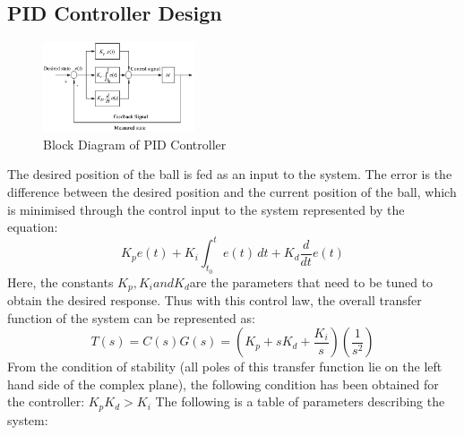 \documentclass[conference]{IEEEtran}
\begin{document}
\subsection*{PID Controller Design}
\begin{figure}[htbp]
\centerline{\includegraphics[width=0.4\textwidth]{BDPID.png}}
\caption{Block Diagram of PID Controller}
\label{fig2}
\end{figure}
The desired position of the ball is fed as an input to the system. The error is the difference between the desired position and the current position of the ball, which is minimised through the control input to the system represented by the equation:
\begin{equation}
K_p e(t) + K_i \int_{t_0}^{t} e(t) \,dt + K_d \frac{d}{dt}e(t)
\label{eq17}\end{equation}
Here, the constants $K_p, K_i and K_d $are the parameters that need to be tuned to obtain the desired response. Thus with this control law, the overall transfer function of the system can be represented as: 
\begin{equation}
T(s) = C(s)G(s) = (K_p + sK_d + \frac{K_i}{s})(\frac{1}{s^2})
\label{eq18}\end{equation}
From the condition of stability (all poles of this transfer function lie on the left hand side of the complex plane), the following condition has been obtained for the controller: $ K_p K_d > K_i$
The following is a table of parameters describing the system:
\end{document}
